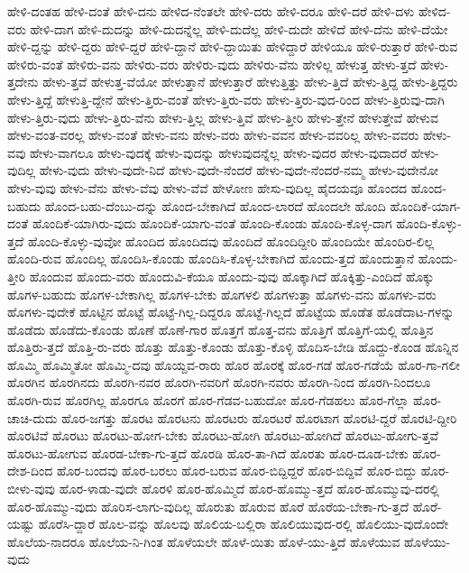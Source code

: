 {ಹೇಳಿ-ದಂತಹ
ಹೇಳಿ-ದಂತೆ
ಹೇಳಿ-ದನು
ಹೇಳಿದ-ನೆಂತಲೇ
ಹೇಳಿ-ದರು
ಹೇಳಿ-ದರೂ
ಹೇಳಿ-ದರೆ
ಹೇಳಿ-ದಳು
ಹೇಳಿದ-ವರು
ಹೇಳಿ-ದಾಗ
ಹೇಳಿ-ದುದನ್ನು
ಹೇಳಿ-ದುದನ್ನೆಲ್ಲ
ಹೇಳಿ-ದುದೆಲ್ಲ
ಹೇಳಿ-ದುದೇ
ಹೇಳಿದೆ
ಹೇಳಿ-ದೆನು
ಹೇಳಿ-ದೆಯೇ
ಹೇಳಿ-ದ್ದನ್ನು
ಹೇಳಿ-ದ್ದರು
ಹೇಳಿ-ದ್ದರೆ
ಹೇಳಿ-ದ್ದಾನೆ
ಹೇಳಿ-ದ್ದಾಯಿತು
ಹೇಳಿದ್ದಾರೆ
ಹೇಳಿಯೂ
ಹೇಳಿ-ರುತ್ತಾರೆ
ಹೇಳಿ-ರುವ
ಹೇಳಿರು-ವಂತೆ
ಹೇಳಿರು-ವನು
ಹೇಳಿರು-ವರು
ಹೇಳಿರು-ವುದು
ಹೇಳಿರು-ವೆನು
ಹೇಳಿಲ್ಲ
ಹೇಳುತ್ತ
ಹೇಳು-ತ್ತದೆ
ಹೇಳು-ತ್ತದೇನು
ಹೇಳು-ತ್ತವೆ
ಹೇಳುತ್ತ-ವೆಯೋ
ಹೇಳುತ್ತಾನೆ
ಹೇಳುತ್ತಾರೆ
ಹೇಳುತ್ತಿತ್ತು
ಹೇಳು-ತ್ತಿದೆ
ಹೇಳು-ತ್ತಿದ್ದ
ಹೇಳು-ತ್ತಿದ್ದರು
ಹೇಳು-ತ್ತಿದ್ದೆ
ಹೇಳುತ್ತಿ-ದ್ದೇನೆ
ಹೇಳು-ತ್ತಿರು-ವಂತೆ
ಹೇಳು-ತ್ತಿರು-ವರು
ಹೇಳು-ತ್ತಿರು-ವುದ-ರಿಂದ
ಹೇಳು-ತ್ತಿರುವು-ದಾಗಿ
ಹೇಳು-ತ್ತಿರು-ವುದು
ಹೇಳು-ತ್ತಿರು-ವೆನು
ಹೇಳು-ತ್ತಿಲ್ಲ
ಹೇಳು-ತ್ತಿವೆ
ಹೇಳು-ತ್ತೀರಿ
ಹೇಳು-ತ್ತೇನೆ
ಹೇಳುತ್ತೇವೆ
ಹೇಳುವ
ಹೇಳು-ವಂತ-ವರಲ್ಲ
ಹೇಳು-ವಂತೆ
ಹೇಳು-ವನು
ಹೇಳು-ವರು
ಹೇಳು-ವವನ
ಹೇಳು-ವವರಿಲ್ಲ
ಹೇಳು-ವವರು
ಹೇಳು-ವವು
ಹೇಳು-ವಾಗಲೂ
ಹೇಳು-ವುದಕ್ಕೆ
ಹೇಳು-ವುದನ್ನು
ಹೇಳುವುದನ್ನೆಲ್ಲ
ಹೇಳು-ವುದರ
ಹೇಳು-ವುದಾದರೆ
ಹೇಳು-ವುದಿಲ್ಲ
ಹೇಳು-ವುದು
ಹೇಳು-ವುದೇ-ನಿದೆ
ಹೇಳು-ವುದೇ-ನೆಂದರೆ
ಹೇಳು-ವುದೇ-ನೆಂದರೆ-ನಮ್ಮ
ಹೇಳು-ವುದೇನೋ
ಹೇಳು-ವುವು
ಹೇಳು-ವೆನು
ಹೇಳು-ವೆವು
ಹೇಳು-ವೆವೆ
ಹೇಳೋಣ
ಹೇಸು-ವುದಿಲ್ಲ
ಹೈದಯವೂ
ಹೊಂದದ
ಹೊಂದ-ಬಹುದು
ಹೊಂದ-ಬಹು-ದೆಂಬು-ದನ್ನು
ಹೊಂದ-ಬೇಕಾಗಿದೆ
ಹೊಂದ-ಲಾರದೆ
ಹೊಂದಲೇ
ಹೊಂದಿ
ಹೊಂದಿಕೆ-ಯಾಗ-ದಂತೆ
ಹೊಂದಿಕೆ-ಯಾಗಿರು-ವುದು
ಹೊಂದಿಕೆ-ಯಾಗು-ವಂತೆ
ಹೊಂದಿ-ಕೊಂಡು
ಹೊಂದಿ-ಕೊಳ್ಳ-ದಾಗ
ಹೊಂದಿ-ಕೊಳ್ಳು-ತ್ತದೆ
ಹೊಂದಿ-ಕೊಳ್ಳು-ವುವೋ
ಹೊಂದಿದ
ಹೊಂದಿದವು
ಹೊಂದಿದೆ
ಹೊಂದಿದ್ದೀರಿ
ಹೊಂದಿಯೇ
ಹೊಂದಿರ-ಲಿಲ್ಲ
ಹೊಂದಿ-ರುವ
ಹೊಂದಿಲ್ಲ
ಹೊಂದಿಸಿ-ಕೊಂಡು
ಹೊಂದಿಸಿ-ಕೊಳ್ಳ-ಬೇಕಾಗಿದೆ
ಹೊಂದು-ತ್ತದೆ
ಹೊಂದುತ್ತಾನೆ
ಹೊಂದು-ತ್ತೀರಿ
ಹೊಂದುವ
ಹೊಂದು-ವರು
ಹೊಂದುವಿ-ಕೆಯೂ
ಹೊಂದು-ವುವು
ಹೊಕ್ಕಾಗಿದೆ
ಹೊಕ್ಕಿತ್ತು-ಎಂದಿದೆ
ಹೊಕ್ಕು
ಹೊಗಳ-ಬಹುದು
ಹೊಗಳ-ಬೇಕಾಗಿಲ್ಲ
ಹೊಗಳ-ಬೇಕು
ಹೊಗಳಲಿ
ಹೊಗಳುತ್ತಾ
ಹೊಗಳು-ವನು
ಹೊಗಳು-ವರು
ಹೊಗಳು-ವುದೇಕೆ
ಹೊಟ್ಟಿನ
ಹೊಟ್ಟೆ
ಹೊಟ್ಟೆ-ಗಿಲ್ಲ-ದಿದ್ದರೂ
ಹೊಟ್ಟೆ-ಗಿಲ್ಲದೆ
ಹೊಟ್ಟೆಯ
ಹೊಡೆತ
ಹೊಡೆದಾಟ-ಗಳನ್ನು
ಹೊಡೆದು
ಹೊಡೆದು-ಕೊಂಡು
ಹೊಣೆ
ಹೊಣೆ-ಗಾರ
ಹೊತ್ತಗೆ
ಹೊತ್ತ-ವನು
ಹೊತ್ತಿಗೆ
ಹೊತ್ತಿಗೆ-ಯಲ್ಲಿ
ಹೊತ್ತಿನ
ಹೊತ್ತಿರು-ತ್ತದೆ
ಹೊತ್ತಿ-ರು-ವರು
ಹೊತ್ತು
ಹೊತ್ತು-ಕೊಂಡು
ಹೊತ್ತು-ಕೊಳ್ಳಿ
ಹೊದಿಸ-ಬೇಡಿ
ಹೊದ್ದು-ಕೊಂಡ
ಹೊನ್ನಿನ
ಹೊಮ್ಮಿ
ಹೊಮ್ಮಿತೋ
ಹೊಮ್ಮಿ-ದವು
ಹೊಯ್ದವ-ರಾರು
ಹೊರ
ಹೊರಕ್ಕೆ
ಹೊರ-ಗಡೆ
ಹೊರ-ಗಡೆಯೆ
ಹೊರ-ಗಾ-ಗಲೀ
ಹೊರಗಿನ
ಹೊರಗಿನದು
ಹೊರಗಿ-ನವರ
ಹೊರಗಿ-ನವರಿಗೆ
ಹೊರಗಿ-ನವರು
ಹೊರಗಿ-ನಿಂದ
ಹೊರಗಿ-ನಿಂದಲೂ
ಹೊರಗಿ-ರುವ
ಹೊರಗಿಲ್ಲ
ಹೊರಗೂ
ಹೊರಗೆ
ಹೊರ-ಗೆಡವ-ಬಹುದೋ
ಹೊರ-ಗೆಡಹಲು
ಹೊರ-ಗೆಲ್ಲಾ
ಹೊರ-ಚಾಚಿ-ದುದು
ಹೊರ-ಜಗತ್ತು
ಹೊರಟ
ಹೊರಟನು
ಹೊರಟರು
ಹೊರಟರೆ
ಹೊರಟಾಗ
ಹೊರಟಿ-ದ್ದರೆ
ಹೊರಟಿ-ದ್ದೀರಿ
ಹೊರಟಿವೆ
ಹೊರಟು
ಹೊರಟು-ಹೋಗ-ಬೇಕು
ಹೊರಟು-ಹೋಗಿ
ಹೊರಟು-ಹೋಗಿದೆ
ಹೊರಟು-ಹೋಗು-ತ್ತವೆ
ಹೊರಟು-ಹೋಗುವ
ಹೊರಡ-ಬೇಕಾ-ಗು-ತ್ತದೆ
ಹೊರಡಿ
ಹೊರ-ತಾ-ಗಿದೆ
ಹೊರತು
ಹೊರ-ದೂಡ-ಬೇಕು
ಹೊರ-ದೇಶ-ದಿಂದ
ಹೊರ-ಬಂದವು
ಹೊರ-ಬರಲು
ಹೊರ-ಬರುವ
ಹೊರ-ಬಿದ್ದಿದ್ದರೆ
ಹೊರ-ಬಿದ್ದಿವೆ
ಹೊರ-ಬಿದ್ದು
ಹೊರ-ಬೀಳು-ವುವು
ಹೊರ-ಳಾಡು-ವುದೇ
ಹೊರಳಿ
ಹೊರ-ಹೊಮ್ಮಿದೆ
ಹೊರ-ಹೊಮ್ಮು-ತ್ತದೆ
ಹೊರ-ಹೊಮ್ಮುವು-ದರಲ್ಲಿ
ಹೊರ-ಹೊಮ್ಮು-ವುದು
ಹೊರಿಸ-ಲಾಗು-ವುದಿಲ್ಲ
ಹೊರುತು
ಹೊರುವ
ಹೊರೆ
ಹೊರೆಯ-ಬೇಕಾ-ಗು-ತ್ತದೆ
ಹೊರೆ-ಯಷ್ಟು
ಹೊರೆಸಿ-ದ್ದಾರೆ
ಹೊಲ-ವನ್ನು
ಹೊಲವು
ಹೊಲಿಯ-ಬಲ್ಲಿರಾ
ಹೊಲಿಯುವುದ-ರಲ್ಲಿ
ಹೊಲಿಯು-ವುದೊಂದೇ
ಹೊಲೆಯ-ನಾದರೂ
ಹೊಲೆಯ-ನಿ-ಗಿಂತ
ಹೊಳೆಯಲೇ
ಹೊಳೆ-ಯಿತು
ಹೊಳೆ-ಯು-ತ್ತಿದೆ
ಹೊಳೆಯುವ
ಹೊಳೆಯು-ವುದು
}
